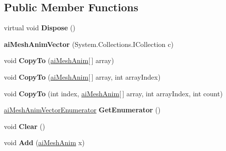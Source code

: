 \subsection*{Public Member Functions}
\begin{DoxyCompactItemize}
\item 
\hypertarget{classai_mesh_anim_vector_a5ee746fcb4083ce2d647d3b2b087e784}{virtual void {\bfseries Dispose} ()}\label{classai_mesh_anim_vector_a5ee746fcb4083ce2d647d3b2b087e784}

\item 
\hypertarget{classai_mesh_anim_vector_ac714f95bd76eeca9bd6e6f343bad1f79}{{\bfseries ai\+Mesh\+Anim\+Vector} (System.\+Collections.\+I\+Collection c)}\label{classai_mesh_anim_vector_ac714f95bd76eeca9bd6e6f343bad1f79}

\item 
\hypertarget{classai_mesh_anim_vector_a88d4c925f74a764623f9e62c312583b9}{void {\bfseries Copy\+To} (\hyperlink{structai_mesh_anim}{ai\+Mesh\+Anim}\mbox{[}$\,$\mbox{]} array)}\label{classai_mesh_anim_vector_a88d4c925f74a764623f9e62c312583b9}

\item 
\hypertarget{classai_mesh_anim_vector_a9950d723ed8290e2eab64adf29f1ad95}{void {\bfseries Copy\+To} (\hyperlink{structai_mesh_anim}{ai\+Mesh\+Anim}\mbox{[}$\,$\mbox{]} array, int array\+Index)}\label{classai_mesh_anim_vector_a9950d723ed8290e2eab64adf29f1ad95}

\item 
\hypertarget{classai_mesh_anim_vector_aaeedb7036196a43d8bca4d23df09641a}{void {\bfseries Copy\+To} (int index, \hyperlink{structai_mesh_anim}{ai\+Mesh\+Anim}\mbox{[}$\,$\mbox{]} array, int array\+Index, int count)}\label{classai_mesh_anim_vector_aaeedb7036196a43d8bca4d23df09641a}

\item 
\hypertarget{classai_mesh_anim_vector_a38757c89a8c769aade4b0fe703eb58f4}{\hyperlink{classai_mesh_anim_vector_1_1ai_mesh_anim_vector_enumerator}{ai\+Mesh\+Anim\+Vector\+Enumerator} {\bfseries Get\+Enumerator} ()}\label{classai_mesh_anim_vector_a38757c89a8c769aade4b0fe703eb58f4}

\item 
\hypertarget{classai_mesh_anim_vector_aaddabb4e974c34d8318b5d88b9509d78}{void {\bfseries Clear} ()}\label{classai_mesh_anim_vector_aaddabb4e974c34d8318b5d88b9509d78}

\item 
\hypertarget{classai_mesh_anim_vector_a85daa93abe751bbb00002094a43ab172}{void {\bfseries Add} (\hyperlink{structai_mesh_anim}{ai\+Mesh\+Anim} x)}\label{classai_mesh_anim_vector_a85daa93abe751bbb00002094a43ab172}


\end{DoxyCompactItemize}
